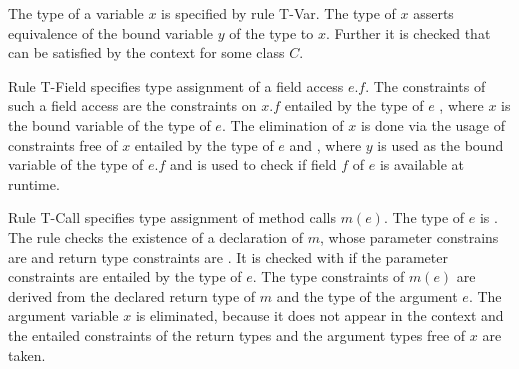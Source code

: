 The type of a variable $x$ is specified by rule T-Var.
The type of $x$ asserts equivalence of the bound variable $y$ of the type to $x$.
Further it is checked that  can be satisfied by the context for some class $C$.

Rule T-Field specifies type assignment of a field access $e.f$.
The constraints of such a field access are the constraints on $x.f$
entailed by the type of $e$
, where $x$ is the bound variable of the type of $e$.
The elimination of $x$ is done via the usage of
constraints free of $x$ entailed by the type of $e$ and ,
where $y$ is used as the bound variable of the type of $e.f$
and  is used to check if
field $f$ of $e$ is available at runtime.

Rule T-Call specifies type assignment of method calls $m(e)$.
The type of $e$ is .
The rule checks the existence of a declaration of $m$,
whose parameter constrains are  and return type constraints are .
It is checked with  if
the parameter constraints are entailed by the type of $e$.
The type constraints of $m(e)$ are derived from the declared return type of $m$
and the type of the argument $e$.
The argument variable $x$ is eliminated, because it does not appear in the context
and the entailed constraints of the return types and the argument types
free of $x$ are taken.

